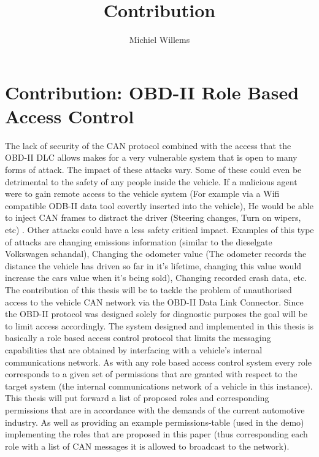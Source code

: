 \documentclass[11pt]{article}
\title{Contribution}
\author{Michiel Willems}
\begin{document}
	
\maketitle

\section{Contribution: OBD-II Role Based Access Control}
The lack of security of the CAN protocol combined with the access that the OBD-II DLC allows makes for a very vulnerable system that is open to many forms of attack. The impact of these attacks vary. Some of these could even be detrimental to the safety of any people inside the vehicle. If a malicious agent were to gain remote access to the vehicle system (For example via a Wifi compatible ODB-II data tool covertly inserted into the vehicle), He would be able to inject CAN frames to distract the driver (Steering changes, Turn on wipers, etc) \cite{Washington}. Other attacks could have a less safety critical impact. Examples of this type of attacks are changing emissions information (similar to the dieselgate Volkswagen schandal), Changing the odometer value (The odometer records the distance the vehicle has driven so far in it's lifetime, changing this value would increase the cars value when it's being sold), Changing recorded crash data, etc. \cite{Bayer15}\newline
\newline
The contribution of this thesis will be to tackle the problem of unauthorised access to the vehicle CAN network via the OBD-II Data Link Connector. Since the OBD-II protocol was designed solely for diagnostic purposes the goal will be to limit access accordingly. The system designed and implemented in this thesis is basically a role based access control protocol that limits the messaging capabilities that are obtained by interfacing with a vehicle's internal communications network.\newline
\newline 
As with any role based access control system every role corresponds to a given set of permissions that are granted with respect to the target system (the internal communications network of a vehicle in this instance). This thesis will put forward a list of proposed roles and corresponding permissions that are in accordance with the demands of the current automotive industry. As well as providing an example permissions-table (used in the demo) implementing the roles that are proposed in this paper (thus corresponding each role with a list of CAN messages it is allowed to broadcast to the network).  \newline
\newline
\end{document}
